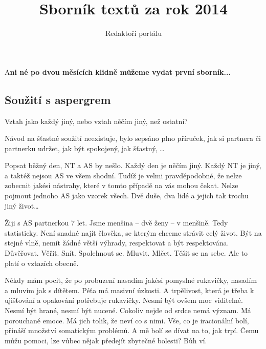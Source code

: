 \documentclass[DIV=calc, paper=a4, fontsize=11pt, twocolumn]{scrartcl}	 %
\title{Sborník textů za rok 2014} %
\author{Redaktoři portálu } %
\date{} %
\newcommand{\initial}[1]{ %
\lettrine[lines=3,lhang=0.3,nindent=0em]{
\color{DarkGoldenrod}
{\textsf{#1}}}{}}
\begin{document}
\maketitle %

\thispagestyle{fancy} %


\initial{A}\textbf{ni né po dvou měsících klidně můžeme vydat první sborník...}



\subsection*{Soužití s aspergrem}

Vztah jako každý jiný, nebo vztah něčím jiný, než ostatní?

Návod na šťastné soužití neexistuje, bylo sepsáno plno příruček, jak
si partnera či partnerku udržet, jak být spokojený, jak šťastný, …

Popsat běžný den, NT a AS by nešlo. Každý den je něčím jiný. Každý NT
je jiný, a taktéž nejsou AS ve všem shodní. Tudíž je velmi
pravděpodobné, že nelze zobecnit jakési nástrahy, které v tomto
případě na vás mohou čekat. Nelze pojmout jednoho AS jako vzorek
všech. Dvě duše, dva lidé a jejich tak trochu jiný život…

Žiji s AS partnerkou 7 let. Jsme menšina – dvě ženy – v menšině. Tedy
statisticky. Není snadné najít člověka, se kterým chceme strávit celý
život. Být na stejné vlně, nemít žádné větší výhrady, respektovat a
být respektována. Důvěřovat. Věřit. Snít. Spolehnout
se. Mluvit. Mlčet. Těšit se na sebe.  Ale to platí o vztazích obecně.

Někdy mám pocit, že po probuzení nasadím jakési pomyslné rukavičky,
nasadím a mluvím jak s dítětem. Péťa má masivní úzkosti. A trpělivost,
která je třeba k ujišťování a opakování potřebuje rukavičky. Nesmí být
ovšem moc viditelné. Nesmí být hrané, nesmí být nucené. Cokoliv nejde
od srdce nemá význam. Má porouchané emoce. Má jich tolik, že neví co s
nimi. Vše, co je iracionální bolí, přináší množství somatickým
problémů. A mě bolí se dívat na to, jak trpí. Čemu můžu pomoci, lze
vůbec nějak předejít zbytečné bolesti? Bůh ví.
\end{document}
